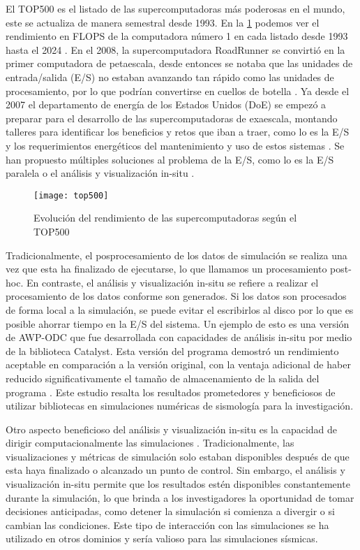 El TOP500 es el listado de las supercomputadoras más poderosas en el mundo, este se actualiza de manera semestral desde 1993. En la \cref{fig:top500} podemos ver el rendimiento en FLOPS de la computadora número 1 en cada listado desde 1993 hasta el 2024 \cite{top500}. En el 2008, la supercomputadora RoadRunner se convirtió en la primer computadora de petaescala, desde entonces se notaba que las unidades de entrada/salida (E/S) no estaban avanzando tan rápido como las unidades de procesamiento, por lo que podrían convertirse en cuellos de botella \cite{Narayan2009}. Ya desde el 2007 el departamento de energía de los Estados Unidos (DoE) se empezó a preparar para el desarrollo de las supercomputadoras de exaescala, montando talleres para identificar los beneficios y retos que iban a traer, como lo es la E/S y los requerimientos energéticos del mantenimiento y uso de estos sistemas \cite{Messina2017}. Se han propuesto múltiples soluciones al problema de la E/S, como lo es la E/S paralela \cite{Byna2022} o el análisis y visualización in-situ \cite{akira_kageyama_approach_2014}.

\begin{figure}[ht]
  \texttt{[image: top500]}
  \caption{Evolución del rendimiento de las supercomputadoras según el TOP500}
  \label{fig:top500}
\end{figure}

Tradicionalmente, el posprocesamiento de los datos de simulación se realiza una vez que esta ha finalizado de ejecutarse, lo que llamamos un procesamiento post-hoc. En contraste, el análisis y visualización in-situ se refiere a realizar el procesamiento de los datos conforme son generados. Si los datos son procesados de forma local a la simulación, se puede evitar el escribirlos al disco por lo que es posible ahorrar tiempo en la E/S del sistema. Un ejemplo de esto es una versión de AWP-ODC que fue desarrollada con capacidades de análisis in-situ por medio de la biblioteca Catalyst. Esta versión del programa demostró un rendimiento aceptable en comparación a la versión original, con la ventaja adicional de haber reducido significativamente el tamaño de almacenamiento de la salida del programa \cite{mu_-situ_2019}. Este estudio resalta los resultados prometedores y beneficiosos de utilizar bibliotecas en simulaciones numéricas de sismología para la investigación.

Otro aspecto beneficioso del análisis y visualización in-situ es la capacidad de dirigir computacionalmente las simulaciones \cite{Grosset2020}. Tradicionalmente, las visualizaciones y métricas de simulación solo estaban disponibles después de que esta haya finalizado o alcanzado un punto de control. Sin embargo, el análisis y visualización in-situ permite que los resultados estén disponibles constantemente durante la simulación, lo que brinda a los investigadores la oportunidad de tomar decisiones anticipadas, como detener la simulación si comienza a divergir o si cambian las condiciones. Este tipo de interacción con las simulaciones se ha utilizado en otros dominios \cite{Yi2014} y sería valioso para las simulaciones sísmicas.


